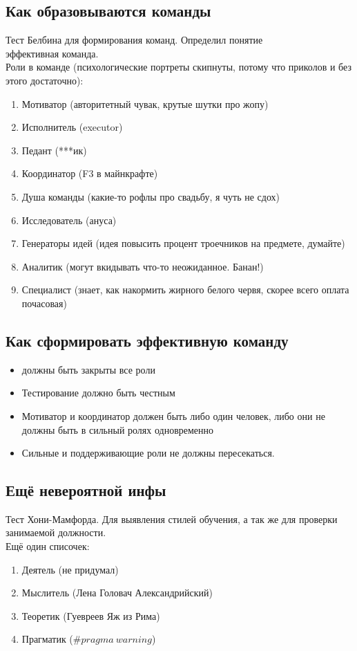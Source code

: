 \documentclass[12pt, letterpaper, twoside]{article}
\begin{document}
    \subsection*{Как образовываются команды}
    Тест Белбина для формирования команд. Определил понятие $\textit{эффективная команда}$.\\
    Роли в команде (психологические портреты скипнуты, потому что приколов и без этого достаточно):
    \begin{enumerate}
        \item Мотиватор (авторитетный чувак, крутые шутки про жопу)
        \item Исполнитель (executor)
        \item Педант (***ик)
        \item Координатор (F3 в майнкрафте)
        \item Душа команды (какие-то рофлы про свадьбу, я чуть не сдох)
        \item Исследователь (ануса)
        \item Генераторы идей (идея повысить процент троечников на предмете, думайте)
        \item Аналитик (могут вкидывать что-то неожиданное. Банан!)
        \item Специалист (знает, как накормить жирного белого червя, скорее всего оплата почасовая)
    \end{enumerate}
    \subsection*{Как сформировать эффективную команду}
    \begin{itemize}
        \item должны быть закрыты все роли
        \item Тестирование должно быть честным
        \item Мотиватор и координатор должен быть либо один человек, либо они не должны быть в сильный ролях одновременно
        \item Сильные и поддерживающие роли не должны пересекаться. 
    \end{itemize}
    \subsection*{Ещё невероятной инфы}
    Тест Хони-Мамфорда. Для выявления стилей обучения, а так же для проверки занимаемой должности.\\
    Ещё один списочек:
    \begin{enumerate}
        \item Деятель (не придумал)
        \item Мыслитель (Лена Головач Александрийский)
        \item Теоретик (Гуевреев Яж из Рима)
        \item Прагматик ($\#pragma\ warning$)
    \end{enumerate}
\end{document}
